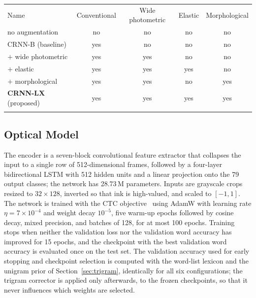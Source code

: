 \documentclass{ws-ijprai}
\newcommand{\ours}{CRNN-LX}            %
\begin{document}
\begin{table}[th]
{\begin{tabular}{lcccc}
\toprule
Name & Conventional & Wide photometric & Elastic & Morphological \\
\colrule
no augmentation            & no  & no  & no  & no  \\
CRNN-B (baseline)          & yes & no  & no  & no  \\
$+$ wide photometric       & yes & yes & no  & no  \\
$+$ elastic                & yes & yes & yes & no  \\
$+$ morphological          & yes & yes & no  & yes \\
\textbf{\ours} (proposed)  & yes & yes & yes & yes \\
\botrule
\end{tabular}}
\end{table}

\subsection{Optical Model}
\label{sec:model}
The encoder is a seven-block convolutional feature extractor that
collapses the input to a single row of 512-dimensional frames,
followed by a four-layer bidirectional LSTM with 512 hidden units and
a linear projection onto the 79 output classes; the network has
28.73\,M parameters. Inputs are grayscale crops resized to
$32\times128$, inverted so that ink is high-valued, and scaled to
$[-1,1]$. The network is trained with the CTC
objective~\cite{graves2006connectionist} using AdamW with learning
rate $\eta=7\times10^{-4}$ and weight decay $10^{-5}$, five warm-up
epochs followed by cosine decay, mixed precision, and batches of 128,
for at most 100 epochs. Training stops when neither the validation loss nor the validation
word accuracy has improved for 15 epochs, and the checkpoint with the
best validation word accuracy is evaluated once on the test set. The
validation accuracy used for early stopping and checkpoint selection is
computed with the word-list lexicon and the unigram prior of
Section~\ref{sec:trigram}, identically for all six configurations; the
trigram corrector is applied only afterwards, to the frozen checkpoints,
so that it never influences which weights are selected.
\end{document}
